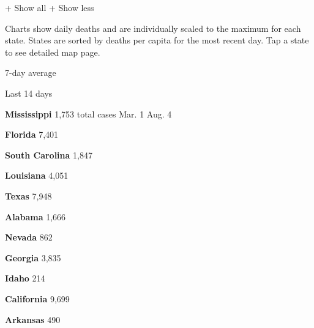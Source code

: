 + Show all + Show less

Charts show daily deaths and are individually scaled to the maximum for
each state. States are sorted by deaths per capita for the most recent
day. Tap a state to see detailed map page.

\href{https://www.nytimes3xbfgragh.onion/interactive/2020/us/mississippi-coronavirus-cases.html}{}

7-day average

Last 14 days

\textbf{Mississippi} 1,753 total cases Mar. 1 Aug. 4

\href{https://www.nytimes3xbfgragh.onion/interactive/2020/us/florida-coronavirus-cases.html}{}

\textbf{Florida} 7,401

\href{https://www.nytimes3xbfgragh.onion/interactive/2020/us/south-carolina-coronavirus-cases.html}{}

\textbf{South Carolina} 1,847

\href{https://www.nytimes3xbfgragh.onion/interactive/2020/us/louisiana-coronavirus-cases.html}{}

\textbf{Louisiana} 4,051

\href{https://www.nytimes3xbfgragh.onion/interactive/2020/us/texas-coronavirus-cases.html}{}

\textbf{Texas} 7,948

\href{https://www.nytimes3xbfgragh.onion/interactive/2020/us/alabama-coronavirus-cases.html}{}

\textbf{Alabama} 1,666

\href{https://www.nytimes3xbfgragh.onion/interactive/2020/us/nevada-coronavirus-cases.html}{}

\textbf{Nevada} 862

\href{https://www.nytimes3xbfgragh.onion/interactive/2020/us/georgia-coronavirus-cases.html}{}

\textbf{Georgia} 3,835

\href{https://www.nytimes3xbfgragh.onion/interactive/2020/us/idaho-coronavirus-cases.html}{}

\textbf{Idaho} 214

\href{https://www.nytimes3xbfgragh.onion/interactive/2020/us/california-coronavirus-cases.html}{}

\textbf{California} 9,699

\href{https://www.nytimes3xbfgragh.onion/interactive/2020/us/arkansas-coronavirus-cases.html}{}

\textbf{Arkansas} 490

